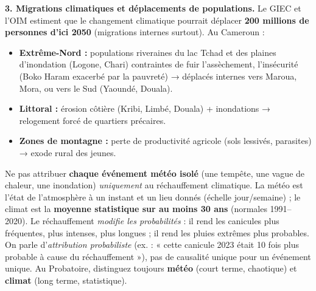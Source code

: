 \documentclass[11pt]{article}
\begin{document}
\noindent \textbf{3. Migrations climatiques et déplacements de populations.}
Le GIEC et l'OIM estiment que le changement climatique pourrait déplacer \textbf{200 millions de personnes d'ici 2050} (migrations internes surtout). Au Cameroun :
\begin{itemize}
    \item \textbf{Extrême-Nord :} populations riveraines du lac Tchad et des plaines d'inondation (Logone, Chari) contraintes de fuir l'assèchement, l'insécurité (Boko Haram exacerbé par la pauvreté) → déplacés internes vers Maroua, Mora, ou vers le Sud (Yaoundé, Douala).
    \item \textbf{Littoral :} érosion côtière (Kribi, Limbé, Douala) + inondations → relogement forcé de quartiers précaires.
    \item \textbf{Zones de montagne :} perte de productivité agricole (sols lessivés, parasites) → exode rural des jeunes.
\end{itemize}

\begin{attention}
Ne pas attribuer \textbf{chaque événement météo isolé} (une tempête, une vague de chaleur, une inondation) \emph{uniquement} au réchauffement climatique. La météo est l'état de l'atmosphère à un instant et un lieu donnés (échelle jour/semaine) ; le climat est la \textbf{moyenne statistique sur au moins 30 ans} (normales 1991--2020). Le réchauffement \emph{modifie les probabilités} : il rend les canicules plus fréquentes, plus intenses, plus longues ; il rend les pluies extrêmes plus probables. On parle d'\emph{attribution probabiliste} (ex. : « cette canicule 2023 était 10 fois plus probable à cause du réchauffement »), pas de causalité unique pour un événement unique. Au Probatoire, distinguez toujours \textbf{météo} (court terme, chaotique) et \textbf{climat} (long terme, statistique).
\end{attention}
\end{document}
